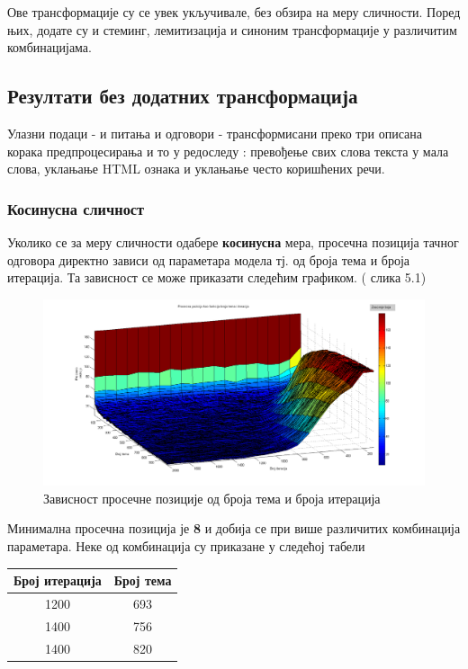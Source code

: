 Ове трансформације су се увек укључивале, без обзира на  меру сличности. Поред њих, додате су и стеминг, лемитизација и синоним трансформације у различитим комбинацијама. 


\subsection{Резултати без додатних трансформација}

Улазни подаци - и питања и одговори - трансформисани преко три описана корака предпроцесирања и то у редоследу :  превођење свих слова текста у мала слова, уклањање HTML ознака и уклањање често коришћених речи.

	\subsubsection{Косинусна сличност}
Уколико се за меру сличности одабере \textbf{косинусна} мера, просечна позиција тачног одговора директно зависи од параметара модела тј. од броја тема и броја итерација. Та зависност се може приказати следећим графиком. ( слика 5.1)
		\begin{figure}[H]
    \centering
   \includegraphics[scale=0.3]{./Slike/noStemNoSyn.png} 
	\caption{Зависност просечне позиције од броја тема и броја итерација}
	\label{fig:slika1}
\end{figure}

Минимална просечна позиција је \textbf{8} и добија се при више различитих комбинација параметара. Неке од комбинација су приказане у следећој табели

\begin{center}
\begin{tabular}{|c|c|}
\hline
Број итерација & Број тема \\
\hline\hline
1200 & 693 \\
1400 & 756 \\
1400 & 820 \\
\hline
\end{tabular}

\end{center}

